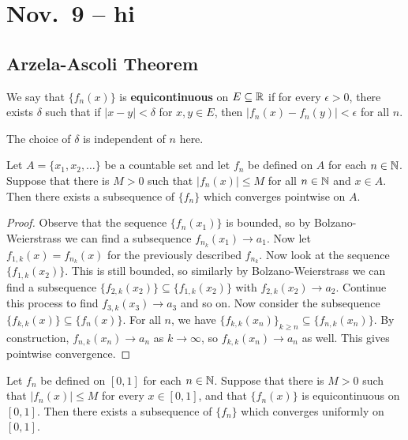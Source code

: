 \chapter{Nov.~9 -- hi}

\section{Arzela-Ascoli Theorem}

\begin{definition}
  We say that $\{f_n(x)\}$ is \textbf{equicontinuous}
  on $E \subseteq \mathbb{R}$ if for every $\epsilon > 0$,
  there exists $\delta$ such that if
  $|x - y| < \delta$ for $x, y \in E$, then
  $|f_n(x) - f_n(y)| < \epsilon$ for all $n$.
\end{definition}

\begin{remark}
  The choice of $\delta$ is independent of $n$ here.
\end{remark}

\begin{lemma}
  \label{lem:pointwise-subsequence}
  Let $A = \{x_1, x_2, \dots\}$ be a countable set and
  let $f_n$ be defined on $A$ for each $n \in \mathbb{N}$.
  Suppose that there is $M > 0$ such that
  $|f_n(x)| \le M$ for all $n \in \mathbb{N}$ and $x \in A$.
  Then there exists a subsequence of $\{f_n\}$ which
  converges pointwise on $A$.
\end{lemma}

\begin{proof}
  Observe that the sequence $\{f_n(x_1)\}$ is bounded,
  so by Bolzano-Weierstrass we can find a subsequence
  $f_{n_k}(x_1) \to a_1$. Now let
  $f_{1, k}(x) = f_{n_k}(x)$ for the previously
  described $f_{n_k}$. Now look at the sequence
  $\{f_{1, k}(x_2)\}$. This is still bounded, so similarly
  by Bolzano-Weierstrass we can find a subsequence
  $\{f_{2, k}(x_2)\} \subseteq \{f_{1, k}(x_2)\}$
  with $f_{2, k}(x_2) \to a_2$. Continue this process
  to find $f_{3, k}(x_3) \to a_3$ and so on.
  Now consider the subsequence
  $\{f_{k, k}(x)\} \subseteq \{f_n(x)\}$. For all
  $n$, we have
  $\{f_{k, k}(x_n)\}_{k \ge n} \subseteq \{f_{n, k}(x_n)\}$.
  By construction, $f_{n, k}(x_n) \to a_n$ as $k \to \infty$,
  so $f_{k, k}(x_n) \to a_n$ as well. This gives
  pointwise convergence.
\end{proof}

\begin{theorem}
  Let $f_n$ be defined on $[0, 1]$ for each $n \in \mathbb{N}$.
  Suppose that there is $M > 0$ such that
  $|f_n(x)| \le M$ for every $x \in [0, 1]$,
  and that $\{f_n(x)\}$ is equicontinuous on $[0, 1]$.
  Then there exists a subsequence of $\{f_n\}$ which
  converges uniformly on $[0, 1]$.
\end{theorem}

